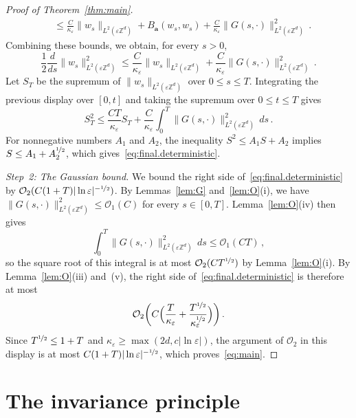 \documentclass[11pt]{amsart}
\numberwithin{equation}{section}
\newcommand{\Z}{\mathbb{Z}}
\newcommand{\ba}{\mathbf{a}}
\newcommand{\cO}{\mathcal{O}}
\newcommand{\eps}{\varepsilon}
\newcommand{\nf}{\nicefrac}
\begin{document}
\begin{proof}[Proof of Theorem~\ref{thm:main}]
\begin{align*}
    & \leq \frac{C}{\kappa_\eps} \|w_s\|_{L^2(\eps \Z^d)} + B_\ba(w_s, w_s) + \frac{C}{\kappa_\eps} \|G(s, \cdot)\|_{L^2(\eps \Z^d)}^2\,.
\end{align*}
Combining these bounds, we obtain, for every $s > 0$,
\begin{equation*}
    \frac12 \frac{d}{ds} \|w_s\|_{L^2(\eps \Z^d)}^2 \leq \frac{C}{\kappa_\eps} \|w_s\|_{L^2(\eps \Z^d)} + \frac{C}{\kappa_\eps} \|G(s, \cdot)\|_{L^2(\eps \Z^d)}^2\,.
\end{equation*}
Let $S_T$ be the supremum of $\|w_s\|_{L^2(\eps \Z^d)}$ over $0 \leq s \leq T$.
Integrating the previous display over $[0,t]$ and taking the supremum over $0 \leq t \leq T$ gives
\begin{equation*}
    S_T^2 \leq \frac{C T}{\kappa_\eps} S_T + \frac{C}{\kappa_\eps} \int_0^T \|G(s, \cdot)\|_{L^2(\eps \Z^d)}^2 \,ds\,.
\end{equation*}
For nonnegative numbers $A_1$ and $A_2$, the inequality $S^2 \leq A_1 S + A_2$ implies $S \leq A_1 + A_2^{\nf12}$, which gives~\eqref{eq:final.deterministic}.

\smallskip

\emph{Step~2: The Gaussian bound.}
We bound the right side of~\eqref{eq:final.deterministic} by ${\cO_2(C (1 + T) |\ln \eps|^{-\nf12})}$.
By Lemmas~\ref{lem:G} and~\ref{lem:O}(i), we have $\|G(s, \cdot)\|_{L^2(\eps \Z^d)}^2 \leq \cO_1(C)$ for every $s \in [0, T]$.
Lemma~\ref{lem:O}(iv) then gives
\begin{equation*}
    \int_0^T \|G(s, \cdot)\|_{L^2(\eps \Z^d)}^2 \,ds \leq \cO_1(C T)\,,
\end{equation*}
so the square root of this integral is at most $\cO_2(C T^{\nf12})$ by Lemma~\ref{lem:O}(i).
By Lemma~\ref{lem:O}(iii) and~(v), the right side of~\eqref{eq:final.deterministic} is therefore at most
\begin{equation*}
    \cO_2 \biggl( C \Bigl( \frac{T}{\kappa_\eps} + \frac{T^{\nf12}}{\kappa_\eps^{\nf12}} \Bigr) \biggr)\,.
\end{equation*}
Since $T^{\nf12} \leq 1 + T$ and $\kappa_\eps \geq \max(2d, c |\ln \eps|)$, the argument of $\cO_2$ in this display is at most $C (1 + T) |\ln \eps|^{-\nf12}$, which proves~\eqref{eq:main}.
\end{proof}

\section{The invariance principle} \label{sec:IP}
\end{document}
